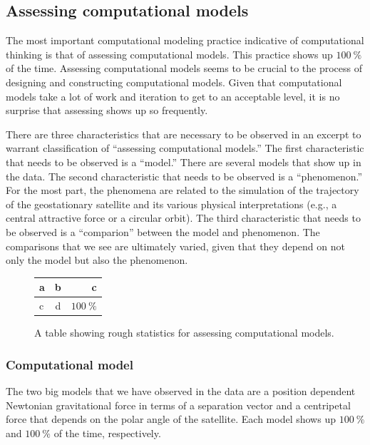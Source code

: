 \documentclass{msuphddissertation}
\begin{document}
\begin{doublespace}
\subsection{Assessing computational models}

The most important computational modeling practice indicative of computational thinking is that of assessing computational models.  This practice shows up $\SI{100}{\percent}$ of the time.  Assessing computational models seems to be crucial to the process of designing and constructing computational models.  Given that computational models take a lot of work and iteration to get to an acceptable level, it is no surprise that assessing shows up so frequently.

There are three characteristics that are necessary to be observed in an excerpt to warrant classification of ``assessing computational models.''  The first characteristic that needs to be observed is a ``model.''  There are several models that show up in the data.  The second characteristic that needs to be observed is a ``phenomenon.''  For the most part, the phenomena are related to the simulation of the trajectory of the geostationary satellite and its various physical interpretations (e.g., a central attractive force or a circular orbit).  The third characteristic that needs to be observed is a ``comparion'' between the model and phenomenon.  The comparisons that we see are ultimately varied, given that they depend on not only the model but also the phenomenon.

\begin{figure}[ht]\centering
\begin{tabular}{l|c|r}
a & b & c \\\hline
c & d & $\SI{100}{\percent}$ \\
\end{tabular}
\caption{A table showing rough statistics for assessing computational models.}\label{CH5:AssessingComputationalModels}
\end{figure}

\subsubsection{Computational model}

The two big models that we have observed in the data are a position dependent Newtonian gravitational force in terms of a separation vector and a centripetal force that depends on the polar angle of the satellite.  Each model shows up $\SI{100}{\percent}$ and $\SI{100}{\percent}$ of the time, respectively.


\end{doublespace}
\end{document}
